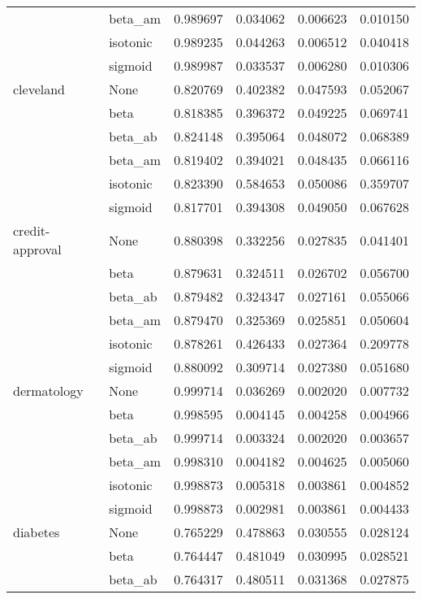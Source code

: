 \begin{tabular}{llrrrr}
        & beta\_am &  0.989697 &  0.034062 &  0.006623 &  0.010150 \\
        & isotonic &  0.989235 &  0.044263 &  0.006512 &  0.040418 \\
        & sigmoid &  0.989987 &  0.033537 &  0.006280 &  0.010306 \\
cleveland & None &  0.820769 &  0.402382 &  0.047593 &  0.052067 \\
        & beta &  0.818385 &  0.396372 &  0.049225 &  0.069741 \\
        & beta\_ab &  0.824148 &  0.395064 &  0.048072 &  0.068389 \\
        & beta\_am &  0.819402 &  0.394021 &  0.048435 &  0.066116 \\
        & isotonic &  0.823390 &  0.584653 &  0.050086 &  0.359707 \\
        & sigmoid &  0.817701 &  0.394308 &  0.049050 &  0.067628 \\
credit-approval & None &  0.880398 &  0.332256 &  0.027835 &  0.041401 \\
        & beta &  0.879631 &  0.324511 &  0.026702 &  0.056700 \\
        & beta\_ab &  0.879482 &  0.324347 &  0.027161 &  0.055066 \\
        & beta\_am &  0.879470 &  0.325369 &  0.025851 &  0.050604 \\
        & isotonic &  0.878261 &  0.426433 &  0.027364 &  0.209778 \\
        & sigmoid &  0.880092 &  0.309714 &  0.027380 &  0.051680 \\
dermatology & None &  0.999714 &  0.036269 &  0.002020 &  0.007732 \\
        & beta &  0.998595 &  0.004145 &  0.004258 &  0.004966 \\
        & beta\_ab &  0.999714 &  0.003324 &  0.002020 &  0.003657 \\
        & beta\_am &  0.998310 &  0.004182 &  0.004625 &  0.005060 \\
        & isotonic &  0.998873 &  0.005318 &  0.003861 &  0.004852 \\
        & sigmoid &  0.998873 &  0.002981 &  0.003861 &  0.004433 \\
diabetes & None &  0.765229 &  0.478863 &  0.030555 &  0.028124 \\
        & beta &  0.764447 &  0.481049 &  0.030995 &  0.028521 \\
        & beta\_ab &  0.764317 &  0.480511 &  0.031368 &  0.027875 \\

\end{tabular}
